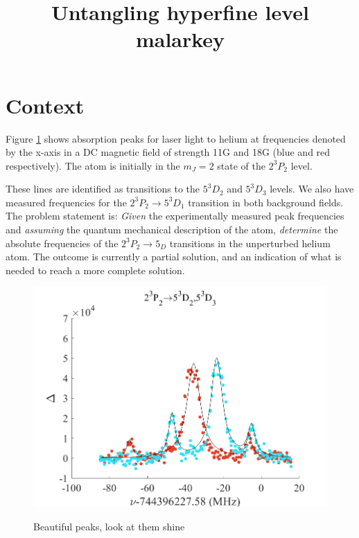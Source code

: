 \documentclass{article}
\begin{document}
\title{Untangling hyperfine level malarkey}
\date{}
\maketitle

\section{Context}

Figure \ref{data_peaks} shows absorption peaks for laser light to helium at frequencies denoted by the x-axis in a DC magnetic field of strength 11G and 18G (blue and red respectively). The atom is initially in the $m_J = 2$ state of the $2^3P_2$ level.


These lines are identified as transitions to the $5^3D_2$ and $5^3D_3$ levels. We also have measured frequencies for the $2^3P_2\rightarrow5^3D_1$ transition in both background fields. The problem statement is: \emph{Given} the experimentally measured peak frequencies and \emph{assuming} the quantum mechanical description of the atom, \emph{determine} the absolute frequencies of the $2^3P_2\rightarrow 5_D$ transitions in the unperturbed helium atom. The outcome is currently a partial solution, and an indication of what is needed to reach a more complete solution.

\begin{figure}[h]
\includegraphics[width=\textwidth]{figs/5^3D_3_plot_combo.png}
\label{data_peaks}
\caption{Beautiful peaks, look at them shine}
\end{figure}
\end{document}
